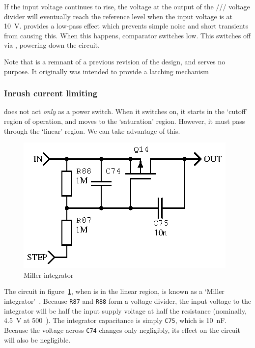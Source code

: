 If the input voltage continues to rise, the voltage at the output of the
/// voltage divider will
eventually reach the reference level when the input voltage is at 10~V.
 provides a low-pass effect which prevents simple noise and short
transients from causing this. When this happens, comparator 
switches low. This switches  off via , powering down
the circuit.

Note that  is a remnant of a previous revision of the design, and
serves no purpose. It originally was intended to provide a latching mechanism


\subsubsection{Inrush current limiting}

 does not act \emph{only} as a power switch. When it switches on,
it starts in the `cutoff' region of operation, and moves to the `saturation'
region. However, it must pass through the `linear' region. We can take
advantage of this.

\begin{figure}[H]
\centering
\includegraphics{too/millerint}
\caption{Miller integrator}
\label{fig:miller}
\end{figure}

The circuit in figure~\ref{fig:miller}, when  is in the linear
region, is known as a `Miller integrator'~\cite[pg. 283]{tranckts-sawtooth}.
Because \texttt{R87} and \texttt{R88} form a voltage divider, the input
voltage to the integrator will be half the input supply voltage at half
the resistance (nominally, 4.5~V at 500~\kOhm). The
integrator capacitance is simply \texttt{C75}, which is 10~nF.
Because the voltage across \texttt{C74} changes only negligibly, its effect
on the circuit will also be negligible.


